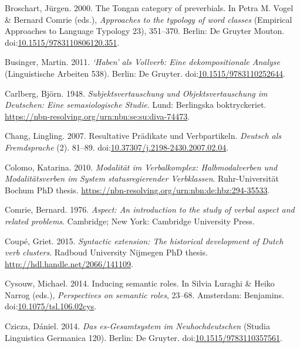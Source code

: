 \leavevmode{}%
Broschart, Jürgen. 2000. The {Tongan} category of preverbials. In Petra
M. Vogel \& Bernard Comrie (eds.), \emph{Approaches to the typology of
word classes} (Empirical Approaches to Language Typology 23), 351--370.
Berlin: De Gruyter Mouton.
doi:\href{https://doi.org/10.1515/9783110806120.351}{10.1515/9783110806120.351}.

\leavevmode{}%
Businger, Martin. 2011. \emph{{`Haben'} als {Vollverb}: Eine
dekompositionale {Analyse}} (Linguistische Arbeiten 538). Berlin: De
Gruyter.
doi:\href{https://doi.org/10.1515/9783110252644}{10.1515/9783110252644}.

\leavevmode{}%
Carlberg, Björn. 1948. \emph{Subjektsvertauschung und
{Objektsvertauschung} im {Deutschen}: Eine semasiologische {Studie}}.
Lund: Berlingska boktryckeriet.
\url{https://nbn-resolving.org/urn:nbn:se:su:diva-74473}.

\leavevmode{}%
Chang, Lingling. 2007. Resultative {Prädikate} und {Verbpartikeln}.
\emph{Deutsch als Fremdsprache} (2). 81--89.
doi:\href{https://doi.org/10.37307/j.2198-2430.2007.02.04}{10.37307/j.2198-2430.2007.02.04}.

\leavevmode{}%
Colomo, Katarina. 2010. \emph{Modalität im {Verbalkomplex}:
{Halbmodalverben} und {Modalitätsverben} im {System} statusregierender
{Verbklassen}}. Ruhr-Universität Bochum PhD thesis.
\url{https://nbn-resolving.org/urn:nbn:de:hbz:294-35533}.

\leavevmode{}%
Comrie, Bernard. 1976. \emph{Aspect: An introduction to the study of
verbal aspect and related problems}. Cambridge; New York: Cambridge
University Press.

\leavevmode{}%
Coupé, Griet. 2015. \emph{Syntactic extension: The historical
development of {Dutch} verb clusters}. Radboud University Nijmegen PhD
thesis. \url{http://hdl.handle.net/2066/141109}.

\leavevmode{}%
Cysouw, Michael. 2014. Inducing semantic roles. In Silvia Luraghi \&
Heiko Narrog (eds.), \emph{Perspectives on semantic roles}, 23--68.
Amsterdam: Benjamins.
doi:\href{https://doi.org/10.1075/tsl.106.02cys}{10.1075/tsl.106.02cys}.

\leavevmode{}%
Czicza, Dániel. 2014. \emph{Das {es-Gesamtsystem} im {Neuhochdeutschen}}
(Studia Linguistica Germanica 120). Berlin: De Gruyter.
doi:\href{https://doi.org/10.1515/9783110357561}{10.1515/9783110357561}.

